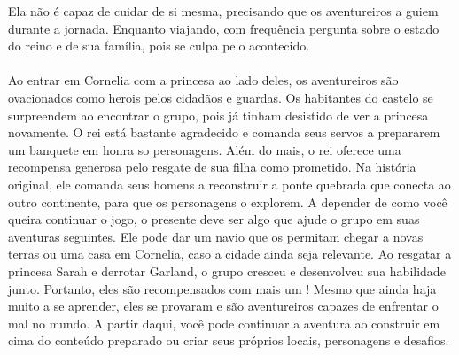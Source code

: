 Ela não é capaz de cuidar de si mesma, precisando que os aventureiros a guiem durante a jornada. Enquanto viajando, com frequência pergunta sobre o estado do reino e de sua família, pois se culpa pelo acontecido.
%
\vfill
%
\\\\
%
Ao entrar em Cornelia com a princesa ao lado deles, os aventureiros são ovacionados como herois pelos cidadãos e guardas.
Os habitantes do castelo se surpreendem ao encontrar o grupo, pois já tinham desistido de ver a princesa novamente.
O rei está bastante agradecido e comanda seus servos a prepararem um banquete em honra so personagens.
Além do mais, o rei oferece uma recompensa generosa pelo resgate de sua filha como prometido.
Na história original, ele comanda seus homens a reconstruir a ponte quebrada que conecta ao outro continente, para que os personagens o explorem. A depender de como você queira continuar o jogo, o presente deve ser algo que ajude o grupo em suas aventuras seguintes.
Ele pode dar um navio que os permitam chegar a novas terras ou uma casa em Cornelia, caso a cidade ainda seja relevante. 
Ao resgatar a princesa Sarah e derrotar Garland, o grupo cresceu e desenvolveu sua habilidade junto.
Portanto, eles são recompensados com mais um ! 
Mesmo que ainda haja muito a se aprender, eles se provaram e são aventureiros capazes de enfrentar o mal no mundo.
A partir daqui, você pode continuar a aventura ao construir em cima do conteúdo preparado ou criar seus próprios locais, personagens e desafios.
%
\clearpage